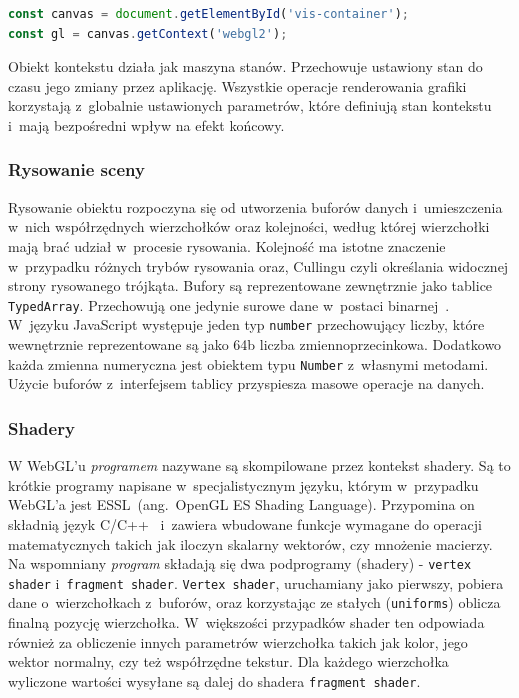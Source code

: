 \begin{lstlisting}[language=javascript, label={lst:webglContext}, caption={Pobranie kontekstu API WebGL do zmiennej}]
const canvas = document.getElementById('vis-container');
const gl = canvas.getContext('webgl2');
\end{lstlisting}

Obiekt kontekstu działa jak maszyna stanów. Przechowuje ustawiony stan do czasu jego zmiany przez aplikację. Wszystkie operacje renderowania grafiki korzystają z~globalnie ustawionych parametrów, które definiują stan kontekstu i~mają bezpośredni wpływ na efekt końcowy\cite[Rozdział 1]{RealTime3DGraphics}.

\subsubsection{Rysowanie sceny}
\label{sec:render}
Rysowanie obiektu rozpoczyna się od utworzenia buforów danych i~umieszczenia w~nich współrzędnych wierzchołków oraz kolejności, według której wierzchołki mają brać udział w~procesie rysowania. Kolejność ma istotne znaczenie w~przypadku różnych trybów rysowania oraz, Cullingu czyli określania widocznej strony rysowanego trójkąta. Bufory są reprezentowane zewnętrznie jako tablice \texttt{TypedArray}. Przechowują one jedynie surowe dane w~postaci binarnej~\cite{TypedArrays}. W~języku JavaScript występuje jeden typ \texttt{number} przechowujący liczby, które wewnętrznie reprezentowane są jako 64b liczba zmiennoprzecinkowa. Dodatkowo każda zmienna numeryczna jest obiektem typu \texttt{Number} z~własnymi metodami. Użycie buforów z~interfejsem tablicy przyspiesza masowe operacje na danych.

\subsubsection{Shadery}

W WebGL'u \textit{programem} nazywane są skompilowane przez kontekst shadery. Są to krótkie programy napisane w~specjalistycznym języku, którym w~przypadku WebGL'a jest ESSL~(ang.~OpenGL ES Shading Language). Przypomina on składnią język C/C++~\cite{ESSL} i~zawiera wbudowane funkcje wymagane do operacji matematycznych takich jak iloczyn skalarny wektorów, czy mnożenie macierzy. Na wspomniany \textit{program} składają się dwa podprogramy (shadery) - \texttt{vertex shader} i~\texttt{fragment shader}. \texttt{Vertex shader}, uruchamiany jako pierwszy, pobiera dane o~wierzchołkach z~buforów, oraz korzystając ze stałych (\texttt{uniforms}) oblicza finalną pozycję wierzchołka. W~większości przypadków shader ten odpowiada również za obliczenie innych parametrów wierzchołka takich jak kolor, jego wektor normalny, czy też współrzędne tekstur. Dla każdego wierzchołka wyliczone wartości wysyłane są dalej do shadera \texttt{fragment shader}.

